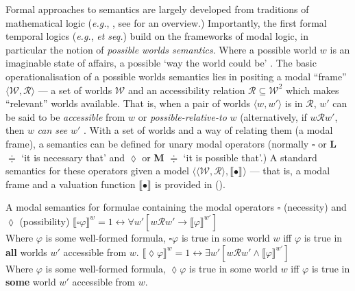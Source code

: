 \documentclass[12pt,dvipsnames]{report}
\providecommand{\denote}[2][]{\ensuremath{\llbracket{#2}\rrbracket^{#1}}}
\begin{document}
Formal approaches to semantics are largely developed from traditions of mathematical logic (\textit{e.g.}, \citealp{Montague1970}, see \citealp{Janssen2016} for an overview.) Importantly, the first formal temporal logics (\textit{e.g.}, \citealp{Prior1957} \textit{et seq.}) build on the frameworks of modal logic, in particular the notion of \textit{possible worlds semantics}. Where a possible world $ w $ is an imaginable state of affairs, a possible `way the world could be' \citep[\textit{e.g.},][]{Lewis1986}. The basic operationalisation of a possible worlds semantics lies in positing a modal ``frame'' $ \langle\mathcal{W,R}\rangle $ --- a set of worlds $ \mathcal W $ and an accessibility relation $ \mathcal{R\subseteq W}^2$ which makes ``relevant'' worlds available. That is, when a pair of worlds $\langle w,w' \rangle$ is in $ \mathcal R $, $ w' $ can be said to be \textit{accessible} from $ w $ or \textit{possible-relative-to} $ w $ (alternatively, if $ w\mathcal Rw' $, then $ w $ \textit{can see} $ w' $ \citep[37]{HC1996}. With a set of worlds and a way of relating them (a modal frame), a semantics can be defined for unary modal operators (normally $ \square $ or \textbf{L} $ \doteqdot $ `it is necessary that' and $ \lozenge $ or \textbf{M} $ \doteqdot $ `it is possible that'.) A standard semantics for these operators given a model $ \langle\mathcal{\langle W,R\rangle},\denote{•}\rangle $ --- that is, a modal frame and a valuation function \denote{•} is provided in (\nextx).


\pex A modal semantics for formulae containing the modal operators $ \square $ (necessity) and $ \lozenge $ (possibility)  \citep[\textit{e.g.},][39]{HC1996}
\a$ \denote[w]{\square\varphi} =1\leftrightarrow\forall w'[w\mathcal{R} w'\to\denote[w']{\varphi}] $\\
Where $ \varphi $ is some well-formed formula, $ \square\varphi $ is true in some world $ w $ iff $ \varphi $ is true in \textbf{all} worlds $ w' $ accessible from $ w $.
\a$  \denote[w]{\lozenge\varphi} =1\leftrightarrow\exists w'[w\mathcal{R} w'\wedge\denote[w']{\varphi}] $\\
Where $ \varphi $ is some well-formed formula, $ \lozenge\varphi $ is true in some world $ w $ iff $ \varphi $ is true in \textbf{some} world $ w' $ accessible from $ w $.
\xe
\end{document}
